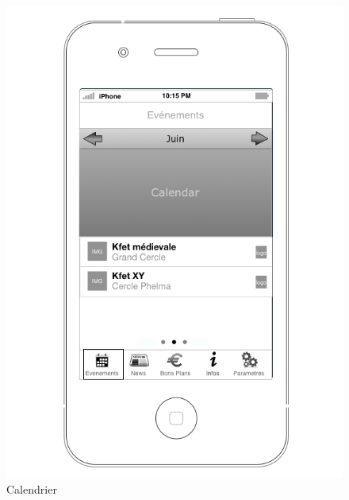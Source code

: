 \documentclass[a4paper, 11px]{article}
\begin{document}
\begin{figure}[htbp]
	\begin{minipage}[c]{.33\linewidth}
		\begin{center}
			\includegraphics[scale=0.3]{../../Sketch/iOS/evenements_calendar.png}
		\end{center}
	\caption{Calendrier}
	\label{calendar}


\end{minipage}
\end{figure}
\end{document}
